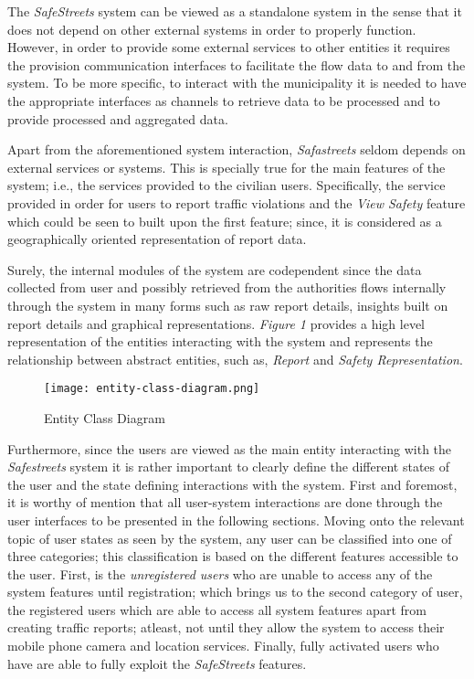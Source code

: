The \emph{SafeStreets} system can be viewed as a standalone system in the sense that it does not depend on other external systems in order to properly function. However, in order to provide some external services to other entities it requires the provision communication interfaces to facilitate the flow data to and from the system. To be more specific, to interact with the municipality it is needed to have the appropriate interfaces as channels to retrieve data to be processed and to provide processed and aggregated data.

Apart from the aforementioned system interaction, \emph{Safastreets} seldom depends on external services or systems. This is specially true for the main features of the system; i.e., the services provided to the civilian users. Specifically, the service provided in order for users to report traffic violations and the \emph{View Safety} feature which could be seen to built upon the first feature; since, it is considered as a geographically oriented representation of report data.

Surely, the internal modules of the system are codependent since the data collected from user and possibly retrieved from the authorities flows internally through the system in many forms such as raw report details, insights built on report details and graphical representations. \emph{Figure 1} provides a high level representation of the entities interacting with the system and represents the relationship between abstract entities, such as, \emph{Report} and \emph{Safety Representation}.

\begin{sidewaysfigure}
\begin{figure}[H]
\caption{Entity Class Diagram}
\label{fig:Class}
\centering
\texttt{[image: entity-class-diagram.png]}
\end{figure}
\end{sidewaysfigure}

Furthermore, since the users are viewed as the main entity interacting with the \emph{Safestreets} system it is rather important to clearly define the different states of the user and the state defining interactions with the system. First and foremost, it is worthy of mention that all user-system interactions are done through the user interfaces to be presented in the following sections. Moving onto the relevant topic of user states as seen by the system, any user can be classified into one of three categories; this classification is based on the different features accessible to the user. First, is the \emph{unregistered users} who are unable to access any of the system features until registration; which brings us to the second category of user, the registered users which are able to access all system features apart from creating traffic reports; atleast, not until they allow the system to access their mobile phone camera and location services. Finally, fully activated users who have are able to fully exploit the \emph{SafeStreets} features.


